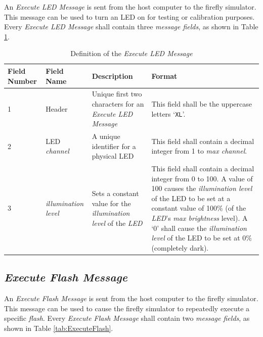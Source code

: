 \documentclass[letterpaper,11pt]{article}
\begin{document}
An \textit{Execute LED Message} is sent from the host computer to the
firefly simulator. This message can be used to turn an LED on for
testing or calibration purposes. Every \textit{Execute LED Message} shall
contain three \textit{message fields}, as shown in Table \ref{tab:ExecuteLED}.

\begin{table}[H]
  \caption{Definition of the \textit{Execute LED Message}}
  \centering
  \setlength\extrarowheight{2pt}
  \begin{tabular}[h]{|p{0.5in}|p{1.00in}|p{2.25in}|p{2.25in}|} \hline
    Field Number & Field Name & Description & Format \\ \hline
    1            & Header
                 & Unique first two characters for an \textit{Execute LED
                 Message}
                 & This field shall be the uppercase letters `\texttt{XL}'.
                 \\ \hline
    2            & LED \textit{channel}
                 & A unique identifier for a physical LED
                 & This field shall contain a decimal integer from 1 to
                 \textit{max channel}.
                 \\ \hline
    3            & \textit{illumination level}
                 & Sets a constant value for the \textit{illumination level}
                 of the \textit{LED}
                 & This field shall contain a decimal integer from 0 to 100.
                 A value of 100 causes the \textit{illumination level} of the
                 LED to be set at a constant value of 100\% (of the
                 \textit{LED}'s \textit{max brightness} level). A `0' shall
                 cause the \textit{illumination level} of the LED to be set at
                 0\% (completely dark).
                 \\ \hline
  \end{tabular}
  \label{tab:ExecuteLED}
\end{table}

\subsection{\textit{Execute Flash Message}}

An \textit{Execute Flash Message} is sent from the host computer to the
firefly simulator. This message can be used to cause the firefly simulator to
repeatedly execute a specific \textit{flash}. Every \textit{Execute
Flash Message} shall contain two \textit{message fields}, as shown in Table
\ref{tab:ExecuteFlash}.
\end{document}

